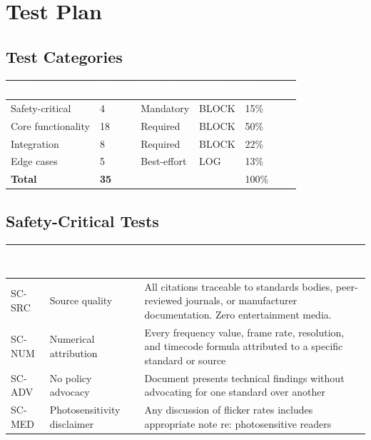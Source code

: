 \documentclass[11pt,letterpaper]{article}
\newcommand{\tableheader}[1]{\textbf{\sffamily\textcolor{white}{#1}}}
\begin{document}
\section{Test Plan}

\subsection{Test Categories}

\begin{center}
\begin{tabularx}{\textwidth}{L{3cm}C{2cm}C{2cm}C{2cm}C{2cm}}
\toprule
{}
\tableheader{Category} & \tableheader{Count} & \tableheader{Priority} & \tableheader{Action} & \tableheader{Target \%} \\
\midrule
Safety-critical & 4 & Mandatory & BLOCK & 15\% \\
Core functionality & 18 & Required & BLOCK & 50\% \\
Integration & 8 & Required & BLOCK & 22\% \\
Edge cases & 5 & Best-effort & LOG & 13\% \\
\midrule
\textbf{Total} & \textbf{35} & & & 100\% \\
\bottomrule
\end{tabularx}
\end{center}

\subsection{Safety-Critical Tests}

\begin{center}
\begin{tabularx}{\textwidth}{L{1.5cm}L{3cm}X}
\toprule
{}
\tableheader{Test ID} & \tableheader{Verifies} & \tableheader{Expected Behavior} \\
\midrule
SC-SRC & Source quality & All citations traceable to standards bodies, peer-reviewed journals, or manufacturer documentation. Zero entertainment media. \\
SC-NUM & Numerical attribution & Every frequency value, frame rate, resolution, and timecode formula attributed to a specific standard or source \\
SC-ADV & No policy advocacy & Document presents technical findings without advocating for one standard over another \\
SC-MED & Photosensitivity disclaimer & Any discussion of flicker rates includes appropriate note re: photosensitive readers \\
\bottomrule
\end{tabularx}
\end{center}
\end{document}
